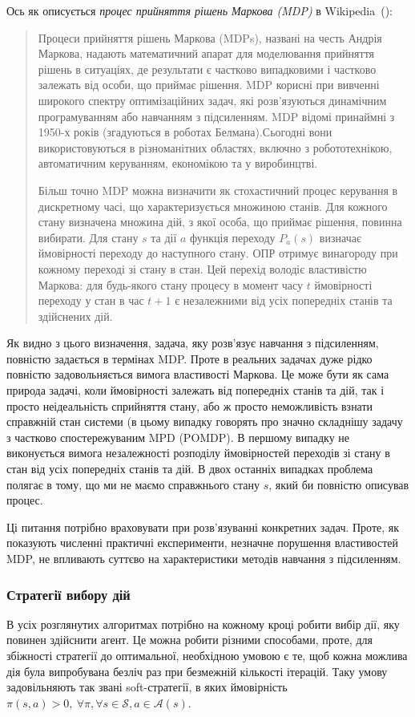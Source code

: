 \documentclass[a4paper,10pt,fleqn]{article}
\begin{document}
Ось як описується \emph{процес прийняття рішень Маркова (MDP)} в Wikipedia~(\cite{WikiMDP}):
\begin{quotation}
	Процеси прийняття рішень Маркова (MDPs), названі на честь Андрія Маркова, надають математичний апарат для моделювання прийняття рішень в ситуаціях, де результати є частково випадковими і частково залежать від особи, що приймає рішення. MDP корисні при вивченні широкого спектру оптимізаційних задач, які розв'язуються динамічним програмуванням або навчанням з підсиленням. MDP відомі принаймні з 1950-х років (згадуються в роботах Белмана).Сьогодні вони використовуються в різноманітних областях, включно з робототехнікою, автоматичним керуванням, економікою та у виробинцтві.

	Більш точно MDP можна визначити як стохастичний процес керування в дискретному часі, що характеризується множиною станів. Для кожного стану визначена множина дій, з якої особа, що приймає рішення, повинна вибирати. Для стану $s$ та дії $a$ функція переходу $P_a(s)$ визначає ймовірності переходу до наступного стану. ОПР отримує винагороду при кожному переході зі стану в стан. Цей перехід володіє властивістю Маркова: для будь-якого стану процесу в момент часу $t$ ймовірності переходу у стан в час $t+1$ є незалежними від усіх попередніх станів та здійснених дій.
\end{quotation}

Як видно з цього визначення, задача, яку розв'язує навчання з підсиленням, повністю задається в термінах MDP. Проте в реальних задачах дуже рідко повністю задовольняється вимога властивості Маркова. Це може бути як сама природа задачі, коли ймовірності залежать від попередніх станів та дій, так і просто неідеальність сприйняття стану, або ж просто неможливість взнати справжній стан системи (в цьому випадку говорять про значно складнішу задачу з частково спостережуваним MPD (POMDP). В першому випадку не виконується вимога незалежності розподілу ймовірностей переходів зі стану в стан від усіх попередніх станів та дій. В двох останніх випадках проблема полягає в тому, що ми не маємо справжнього стану $s$, який би повністю описував процес.

Ці питання потрібно враховувати при розв'язуванні конкретних задач. Проте, як показують численні практичні експерименти, незначне порушення властивостей MDP, не впливають суттєво на характеристики методів навчання з підсиленням.

\subsubsection{Стратегії вибору дій}
В усіх розглянутих алгоритмах потрібно на кожному кроці робити вибір дії, яку повинен здійснити агент. Це можна робити різними способами, проте, для збіжності стратегії до оптимальної, необхідною умовою є те, щоб кожна можлива дія була випробувана безліч раз при безмежній кількості ітерацій. Таку умову задовільняють так звані soft-стратегії, в яких ймовірність $\pi(s,a)>0,\ \forall \pi, \forall s \in \mathcal{S}, a \in \mathcal{A}(s)$.
\end{document}
